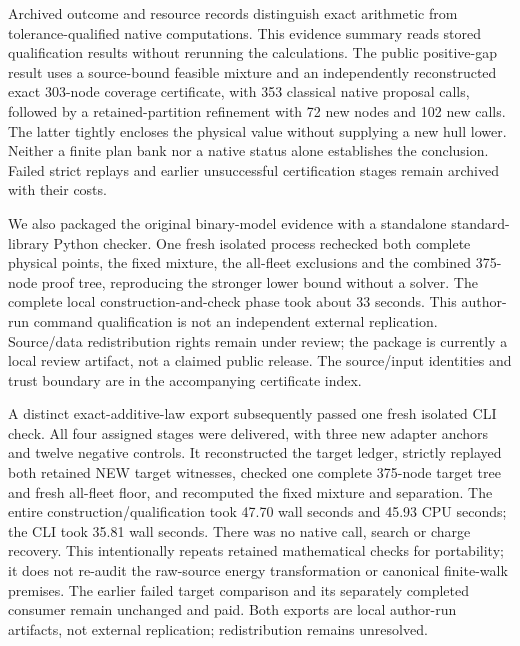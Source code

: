 Archived outcome and resource records distinguish exact arithmetic from
tolerance-qualified native computations. This evidence summary reads stored
qualification results without rerunning the calculations. The public
positive-gap result uses a source-bound feasible mixture and an independently
reconstructed exact 303-node coverage certificate, with 353 classical native
proposal calls, followed by a retained-partition refinement with 72 new nodes
and 102 new calls. The latter tightly encloses the physical value without
supplying a new hull lower. Neither a finite plan bank nor a native status
alone establishes the conclusion. Failed strict replays and earlier
unsuccessful certification stages remain archived with their costs.

We also packaged the original binary-model evidence with a standalone standard-library
Python checker. One fresh isolated process rechecked both complete physical
points, the fixed mixture, the all-fleet exclusions and the combined 375-node
proof tree, reproducing the stronger lower bound without a solver.
The complete local construction-and-check phase took about 33 seconds.
This author-run command qualification is not an independent external
replication. Source/data redistribution rights remain under review; the
package is currently a local review artifact, not a claimed public release.
The source/input identities and trust boundary are in the accompanying
certificate index.

A distinct exact-additive-law export subsequently passed one fresh isolated
CLI check. All four assigned stages were delivered, with three new adapter
anchors and twelve negative controls. It reconstructed the target ledger,
strictly replayed both retained NEW target witnesses, checked one complete
375-node target tree and fresh all-fleet floor, and recomputed the fixed
mixture and separation. The entire construction/qualification took
47.70 wall seconds and 45.93 CPU seconds; the CLI took 35.81 wall seconds.
There was no native call, search or charge recovery. This intentionally
repeats retained mathematical checks for portability; it does not re-audit
the raw-source energy transformation or canonical finite-walk premises.
The earlier failed target comparison and its separately completed consumer
remain unchanged and paid. Both exports are local author-run artifacts,
not external replication; redistribution remains unresolved.
